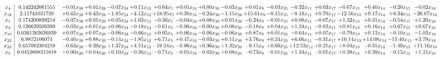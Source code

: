 \documentclass[9pt]{article}
\begin{document}
 \[\begin{array}{c| c c@{\hskip 2pt} c@{\hskip 2pt} c@{\hskip 2pt} c@{\hskip 2pt} c@{\hskip 2pt} c@{\hskip 2pt} c@{\hskip 2pt} c@{\hskip 2pt} c@{\hskip 2pt} c@{\hskip 2pt} c@{\hskip 2pt} c@{\hskip 2pt} c@{\hskip 2pt} c@{\hskip 2pt} c@{\hskip 2pt} c@{\hskip 2pt} }
 x_{4}   &  0.142242061555 & -0.01 x_{28} & +  0.01 x_{20} & -0.07 x_{24} & +  0.11 x_{12} & +  0.64 x_{5} & +  0.05 x_{34} & +  0.00 x_{30} & -0.03 x_{26} & +  0.01 x_{9} & -0.03 x_{25} & -0.32 x_{11} & +  0.03 x_{17} & -0.67 x_{13} & +  0.40 x_{14} & -0.20 x_{15} & -0.02 x_{16}\\
 x_{18}   &  2.11741031739 & +  0.43 x_{28} & +  0.43 x_{20} & -1.85 x_{24} & -4.12 x_{12} & + 18.95 x_{5} & +  0.30 x_{34} & -0.24 x_{30} & -1.15 x_{26} & + 15.61 x_{9} & -0.15 x_{25} & -8.18 x_{11} & +  0.70 x_{17} & -12.56 x_{13} & +  9.17 x_{14} & +  8.34 x_{15} & -26.67 x_{16}\\
 x_{1}   &  0.174200899214 & -0.07 x_{28} & +  0.01 x_{20} & +  0.05 x_{24} & +  1.63 x_{12} & -0.30 x_{5} & -0.04 x_{34} & +  0.08 x_{30} & +  0.01 x_{26} & -0.24 x_{9} & -0.01 x_{25} & +  0.08 x_{11} & -0.07 x_{17} & +  1.32 x_{13} & +  0.31 x_{14} & -0.54 x_{15} & +  1.20 x_{16}\\
 x_{2}   &  0.126629509399 & -0.03 x_{28} & +  0.01 x_{20} & +  0.06 x_{24} & -0.18 x_{12} & -0.61 x_{5} & -0.06 x_{34} & -0.00 x_{30} & +  0.08 x_{26} & -0.18 x_{9} & +  0.04 x_{25} & +  1.24 x_{11} & -0.02 x_{17} & +  0.81 x_{13} & +  0.16 x_{14} & +  0.67 x_{15} & +  0.67 x_{16}\\
 x_{10}   &  0.0361262626939 & +  0.07 x_{28} & +  0.07 x_{20} & -0.06 x_{24} & -0.66 x_{12} & +  0.95 x_{5} & +  0.06 x_{34} & -0.06 x_{30} & -0.06 x_{26} & +  0.87 x_{9} & +  0.01 x_{25} & -0.64 x_{11} & +  0.07 x_{17} & -0.79 x_{13} & +  0.12 x_{14} & -0.10 x_{15} & -1.02 x_{16}\\
 x_{22}   &  6.9872106074 & -0.40 x_{28} & +  0.88 x_{20} & -0.14 x_{24} & -1.85 x_{12} & +  6.71 x_{5} & +  0.47 x_{34} & -0.03 x_{30} & +  0.11 x_{26} & +  3.76 x_{9} & +  0.24 x_{25} & +  6.66 x_{11} & -0.31 x_{17} & + 10.14 x_{13} & + 14.08 x_{14} & -15.40 x_{15} & +  3.79 x_{16}\\
 x_{23}   &  0.657082304219 & -0.63 x_{28} & -0.39 x_{20} & +  1.37 x_{24} & +  4.51 x_{12} & -19.24 x_{5} & -0.96 x_{34} & +  0.36 x_{30} & +  1.32 x_{26} & -9.11 x_{9} & +  0.66 x_{25} & + 12.53 x_{11} & +  0.21 x_{17} & +  8.04 x_{13} & -0.31 x_{14} & -1.49 x_{15} & + 11.16 x_{16}\\
 x_{3}   &  0.0452808315818 & +  0.00 x_{28} & +  0.04 x_{20} & +  0.10 x_{24} & -0.26 x_{12} & -0.71 x_{5} & -0.01 x_{34} & -0.02 x_{30} & +  0.08 x_{26} & -0.73 x_{9} & -0.01 x_{25} & +  1.34 x_{11} & -0.01 x_{17} & +  0.39 x_{13} & +  0.39 x_{14} & -0.15 x_{15} & +  1.21 x_{16}\\

\end{array}\]
\end{document}
